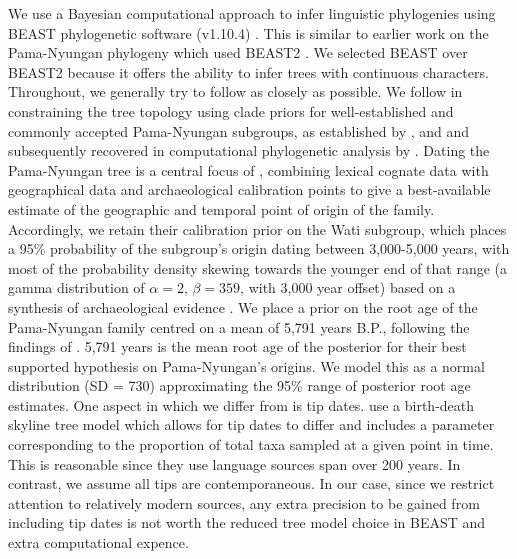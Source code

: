 We use a Bayesian computational approach to infer linguistic phylogenies using BEAST phylogenetic software (v1.10.4) \autocite{suchard_bayesian_2018}. This is similar to earlier work on the Pama-Nyungan phylogeny \autocites{bowern_computational_2012}{bouckaert_origin_2018} which used BEAST2 \autocite{bouckaert_beast_2019}. We selected BEAST over BEAST2 because it offers the ability to infer trees with continuous characters. Throughout, we generally try to follow \textcite{bouckaert_origin_2018} as closely as possible. We follow \textcite{bouckaert_origin_2018} in constraining the tree topology using clade priors for well-established and commonly accepted Pama-Nyungan subgroups, as established by \textcite{ogrady_languages_1966}, \textcite{muhlhausler_atlas_1996} and \textcite{koch_languages_2014} and subsequently recovered in computational phylogenetic analysis by \textcite{bowern_computational_2012}. Dating the Pama-Nyungan tree is a central focus of \textcite{bouckaert_origin_2018}, combining lexical cognate data with geographical data and archaeological calibration points to give a best-available estimate of the geographic and temporal point of origin of the family. Accordingly, we retain their calibration prior on the Wati subgroup, which places a 95\% probability of the subgroup's origin dating between 3,000-5,000 years, with most of the probability density skewing towards the younger end of that range (a gamma distribution of \(\alpha = 2\), \(\beta = 359\), with 3,000 year offset) based on a synthesis of archaeological evidence \autocite[see][p.~746]{bouckaert_origin_2018}. We place a prior on the root age of the Pama-Nyungan family centred on a mean of 5,791 years B.P., following the findings of \textcite{bouckaert_origin_2018}. 5,791 years is the mean root age of the posterior for their best supported hypothesis on Pama-Nyungan's origins. We model this as a normal distribution (SD = 730) approximating the 95\% range of posterior root age estimates. One aspect in which we differ from \textcite{bouckaert_origin_2018} is tip dates. \textcite{bouckaert_origin_2018} use a birth-death skyline tree model which allows for tip dates to differ and includes a parameter corresponding to the proportion of total taxa sampled at a given point in time. This is reasonable since they use language sources span over 200 years. In contrast, we assume all tips are contemporaneous. In our case, since we restrict attention to relatively modern sources, any extra precision to be gained from including tip dates is not worth the reduced tree model choice in BEAST and extra computational expence.

